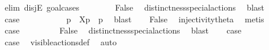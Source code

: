 \begin{isabellebody}
\isamarkupfalse%
\ {\isacharparenleft}{\kern0pt}elim\ disjE{\isacharcomma}{\kern0pt}\ goal{\isacharunderscore}{\kern0pt}cases{\isacharparenright}{\kern0pt}\isanewline
\ \ \isamarkupfalse%
\ {}\isanewline
\ \ \isamarkupfalse%
\ False\ \isamarkupfalse%
\ distinctness{\isacharunderscore}{\kern0pt}special{\isacharunderscore}{\kern0pt}actions\ \isamarkupfalse%
\ blast\isanewline
\ \ \isamarkupfalse%
\ {\isacharquery}{\kern0pt}case\ \isacommand{{\isachardot}{\kern0pt}{\isachardot}{\kern0pt}}\isamarkupfalse%
\isanewline
{}\isamarkupfalse%
\isanewline
\ \ \isamarkupfalse%
\ {}\isanewline
\ \ \isamarkupfalse%
\ \isamarkupfalse%
\ p{\isacharprime}{\kern0pt}\ \ {\isacartoucheopen}{\isasymtheta}{\isacharbrackleft}{\kern0pt}X{\isacharbrackright}{\kern0pt}{\isacharparenleft}{\kern0pt}p{\isacharparenright}{\kern0pt}\ {\isacharequal}{\kern0pt}\ {\isasymtheta}{\isacharparenleft}{\kern0pt}p{\isacharprime}{\kern0pt}{\isacharparenright}{\kern0pt}{\isacartoucheclose}\ \isamarkupfalse%
\ blast\isanewline
\ \ \isamarkupfalse%
\ False\ \isamarkupfalse%
\ injectivity{\isacharunderscore}{\kern0pt}theta{\isacharparenleft}{\kern0pt}{}{\isacharparenright}{\kern0pt}\ \isamarkupfalse%
\ metis\isanewline
\ \ \isamarkupfalse%
\ {\isacharquery}{\kern0pt}case\ \isacommand{{\isachardot}{\kern0pt}{\isachardot}{\kern0pt}}\isamarkupfalse%
\isanewline
{}\isamarkupfalse%
\isanewline
\ \ \isamarkupfalse%
\ {}\isanewline
\ \ \isamarkupfalse%
\ False\ \isamarkupfalse%
\ distinctness{\isacharunderscore}{\kern0pt}special{\isacharunderscore}{\kern0pt}actions\ \isamarkupfalse%
\ blast\isanewline
\ \ \isamarkupfalse%
\ {\isacharquery}{\kern0pt}case\ \isacommand{{\isachardot}{\kern0pt}{\isachardot}{\kern0pt}}\isamarkupfalse%
\isanewline
{}\isamarkupfalse%
\isanewline
\ \ \isamarkupfalse%
\ {}\isanewline
\ \ \isamarkupfalse%
\ \isamarkupfalse%
\ {\isacharquery}{\kern0pt}case\ \isamarkupfalse%
\ visible{\isacharunderscore}{\kern0pt}actions{\isacharunderscore}{\kern0pt}def\ \isamarkupfalse%
\ auto\isanewline
{}\isamarkupfalse%
\isanewline
\ \ \isamarkupfalse%

\end{isabellebody}
